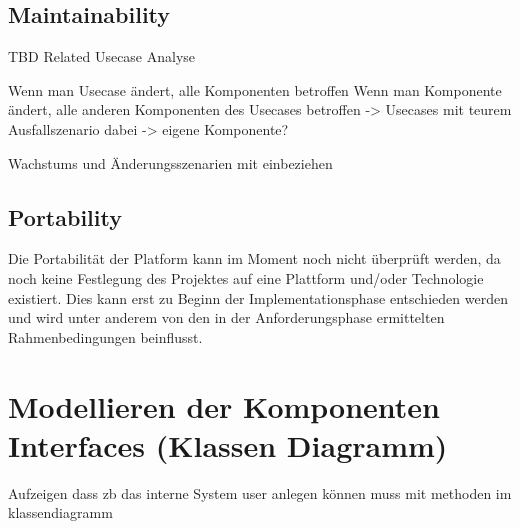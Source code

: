 \subsection{Maintainability}
TBD
Related Usecase Analyse

Wenn man Usecase ändert, alle Komponenten betroffen
Wenn man Komponente ändert, alle anderen Komponenten des Usecases betroffen
-> Usecases mit teurem Ausfallszenario dabei -> eigene Komponente?

Wachstums und Änderungsszenarien mit einbeziehen

\subsection{Portability}
Die Portabilität der Platform kann im Moment noch nicht überprüft werden, da noch keine Festlegung des Projektes auf eine Plattform und/oder Technologie existiert. Dies kann erst zu Beginn der Implementationsphase entschieden werden und wird unter anderem von den in der Anforderungsphase ermittelten Rahmenbedingungen beinflusst.


\section{Modellieren der Komponenten Interfaces (Klassen Diagramm)}
Aufzeigen dass zb das interne System user anlegen können muss mit methoden im klassendiagramm
